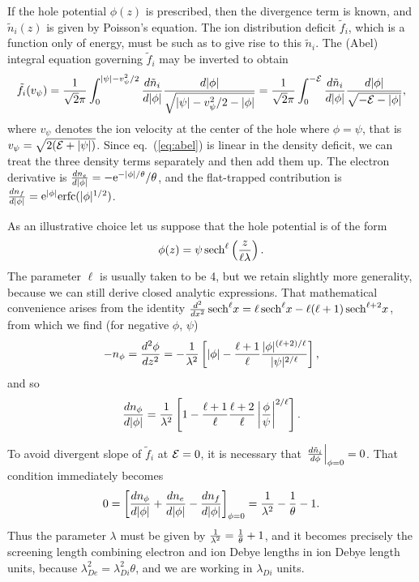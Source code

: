 \documentclass[12pt]{article}  %
\def\energy{{\cal E}}
\def\etothe#1{{\rm e}^{#1}}
\def\sech{{\,\rm sech}}
\begin{document}
If the hole potential $\phi(z)$ is prescribed, then the divergence
term is known, and $\tilde n_i(z)$ is given by Poisson's equation. The
ion distribution deficit $\tilde f_i$, which is a function only of energy,
must be such as to give rise to this $\tilde n_i$. The (Abel) integral
equation governing $\tilde f_i$ may be inverted to obtain
\begin{equation}
  \label{eq:abel}
  \tilde f_i(v_\psi) = {1\over \sqrt{2}\pi}\int_0^{|\psi|-v_\psi^2/2}
    {d\tilde n_i\over d|\phi|}{d|\phi|\over
      \sqrt{|\psi|-v_\psi^2/2-|\phi|} }
    ={1\over \sqrt{2}\pi}\int_0^{-\energy}
    {d\tilde n_i\over d|\phi|}{d|\phi|\over
      \sqrt{-\energy-|\phi|} },
\end{equation}
where $v_\psi$ denotes the ion velocity at the center of the hole
where $\phi=\psi$, that is $v_\psi=\sqrt{2(\energy+|\psi|)}$. Since
eq.\ (\ref{eq:abel}) is linear in the density deficit, we can treat the
three density terms separately and then add them up. The electron
derivative is ${dn_e\over d|\phi|}= -\etothe{-|\phi|/\theta}/\theta$,
and the flat-trapped contribution is
${dn_f\over d|\phi|}= \etothe{|\phi|}{\rm erfc}(|\phi|^{1/2})$.

As an illustrative choice let us suppose that the hole potential is of
the form
\begin{equation}
  \label{eq:potl}
  \phi(z) = \psi \sech^\ell\left({z\over\ell\lambda}\right).
\end{equation}
The parameter $\ell$ is usually taken to be 4, but we retain
slightly more generality, because we can still derive closed analytic
expressions. That mathematical convenience arises from the identity
${d^2\over dx^2} \sech^\ell x = \ell\sech^\ell x
-\ell(\ell+1)\sech^{\ell+2}x$, from which we find (for negative
$\phi$, $\psi$)
\begin{equation}
  \label{eq:diverg}
  -n_\phi={d^2\phi\over dz^2}=-{1\over \lambda^2}\left[
    |\phi| -{\ell+1\over \ell}{|\phi|^{(\ell+2)/\ell}\over |\psi|^{2/\ell}}
  \right],
\end{equation}
and so
\begin{equation}
  \label{eq:derivdiv}
  {d n_\phi\over d|\phi|}={1\over \lambda^2}\left[
    1 -{\ell+1\over \ell}{\ell+2\over \ell}\left|\phi\over \psi\right|^{2/\ell}
  \right].
\end{equation}

To avoid divergent slope of $\tilde f_i$ at $\energy=0$, it is necessary
that $\left.d\tilde n_i\over d\phi\right|_{\phi=0}=0$. That condition 
immediately becomes
\begin{equation}
  \label{eq:shielding}
 0= \left[{d n_\phi\over d|\phi|} +  {dn_e\over d|\phi|}- {dn_f\over d|\phi|}\right]_{\phi=0}=
  {1\over \lambda^2}- {1\over \theta} - 1.
\end{equation}
Thus the parameter $\lambda$ must be given by
$ {1\over \lambda^2}= {1\over \theta}+1$, and it becomes precisely the
screening length combining electron and ion Debye lengths in ion Debye
length units, because $\lambda_{De}^2=\lambda_{Di}^2\theta$, and we
are working in $\lambda_{Di}$ units.
\end{document}
